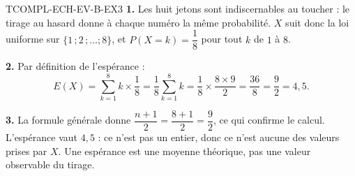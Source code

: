 \begin{corrige}{TCOMPL-ECH-EV-B-EX3}
\textbf{1.} Les huit jetons sont indiscernables au toucher : le tirage au hasard donne à chaque numéro la même probabilité. $X$ suit donc la loi uniforme sur $\{1\,;2\,;\dots;8\}$, et $P(X=k)=\dfrac18$ pour tout $k$ de $1$ à $8$.

\textbf{2.} Par définition de l'espérance :
\[
  E(X)=\sum_{k=1}^{8} k\times\frac18=\frac18\sum_{k=1}^{8}k=\frac18\times\frac{8\times9}{2}=\frac{36}{8}=\frac92=4{,}5.
\]

\textbf{3.} La formule générale donne $\dfrac{n+1}{2}=\dfrac{8+1}{2}=\dfrac92$, ce qui confirme le calcul. L'espérance vaut $4{,}5$ : ce n'est pas un entier, donc ce n'est aucune des valeurs prises par $X$. Une espérance est une moyenne théorique, pas une valeur observable du tirage.
\end{corrige}
